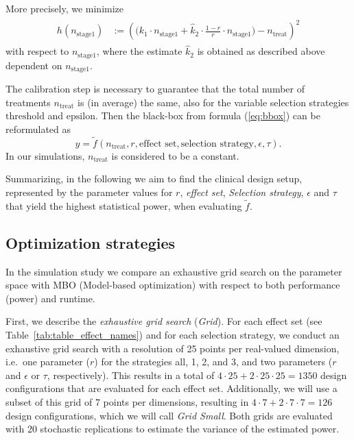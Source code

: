 \documentclass[bimj,fleqn]{w-art}
\theoremstyle{plain}
\theoremstyle{definition}
\begin{document}
More precisely, we minimize
\begin{align}
  \label{eq:targettreat}
  \begin{split}
  h(n_{\text{stage1}}) &:= \left( \Big(k_1 \cdot n_{\text{stage1}} + \hat{k}_2 \cdot %
  \frac{1-r}{r} \cdot n_{\text{stage1}}
  \Big) - n_{\text{treat}} \right)^2
  \end{split}
\end{align}
with respect to $n_{\text{stage1}}$, where the estimate $\hat{k}_2$ is obtained as described above dependent on $n_{\text{stage1}}$. 

The calibration step is necessary to guarantee that the total number of treatments $n_{\text{treat}}$ is (in average) the same, also for the variable selection strategies $\text{threshold}$ and $\text{epsilon}$. Then the black-box from formula (\ref{eq:bbox}) can be reformulated as 
\begin{equation}
  y = \tilde{f}(n_{\text{treat}}, r, \text{effect set}, \text{selection strategy}, \epsilon, \tau).
\end{equation}
In our simulations, $n_{\text{treat}}$ is considered to be a constant.

Summarizing, in the following we aim to find the clinical design setup, represented by the parameter values for $r$, \emph{effect set}, \emph{Selection strategy}, $\epsilon$ and $\tau$ that yield the highest statistical power, when evaluating $\tilde{f}$.

\subsection{Optimization strategies}

In the simulation study we compare an exhaustive grid search on the parameter space with MBO (Model-based optimization) with respect to both performance (power) and runtime.

First, we describe the \emph{exhaustive grid search} (\emph{Grid}).
For each effect set (see Table~\ref{tab:table_effect_names}) and for each selection strategy, we conduct an exhaustive grid search with a resolution of 25 points per real-valued dimension, i.e.\ one parameter ($r$) for the strategies all, 1, 2, and 3, and two parameters ($r$ and $\epsilon$ or $\tau$, respectively).
This results in a total of $4 \cdot 25 + 2 \cdot 25 \cdot 25 = 1350$ design configurations that are evaluated for each effect set.
Additionally, we will use a subset of this grid of 7 points per dimensions, resulting in $4 \cdot 7 + 2 \cdot 7 \cdot 7 = 126$ design configurations, which we will call \emph{Grid Small}.
Both grids are evaluated with 20 stochastic replications to estimate the variance of the estimated power.
\end{document}
